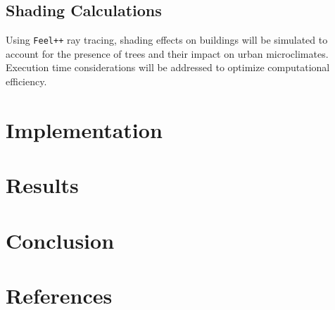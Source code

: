 \documentclass[12pt]{article}
\begin{document}
\subsection{Shading Calculations}
Using \texttt{Feel++} ray tracing, shading effects on buildings will be simulated to account for the presence 
of trees and their impact on urban microclimates. Execution time considerations will be 
addressed to optimize computational efficiency.

\section{Implementation}


\section{Results}


\newpage

\section{Conclusion}


\newpage

\section{References}


\end{document}
